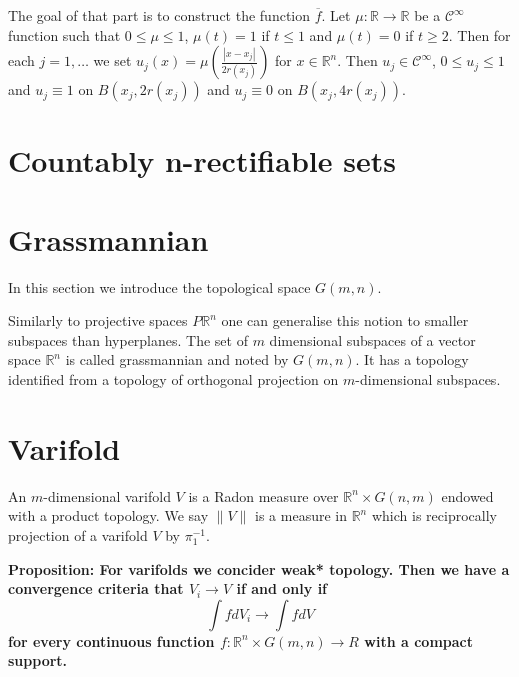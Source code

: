 \documentclass{article}
\begin{document}
\vspace{1ex}
The goal of that part is to construct the function $\overline f$. Let $\mu:
\mathbb{R}\rightarrow\mathbb{R}$ be a $\mathcal{C}^\infty$ function such that
$0\leq\mu\leq1$, $\mu(t) = 1$ if $t\leq 1$ and $\mu(t)=0$ if $t\geq 2$. Then
for each $j=1,\ldots$ we set $u_j(x)=\mu\left(\frac{|x-x_j|}{2r(x_j)}\right)$
for $x\in\mathbb{R}^n$. Then $u_j\in\mathcal{C}^\infty$, $0\leq u_j\leq1$ and
$u_j\equiv 1$ on $B(x_j, 2r(x_j))$ and $u_j\equiv 0$ on $B(x_j, 4r(x_j))$. 

\section{Countably n-rectifiable sets}


\section{Grassmannian}

In this section we introduce the topological space $G(m,n)$.
\vspace{1ex}

Similarly to projective spaces $P\mathbb{R}^n$ one can generalise this notion to
smaller subspaces than hyperplanes. The set of $m$ dimensional subspaces of a
vector space $\mathbb{R}^n$ is called grassmannian and noted by $G(m,n)$. It
has a topology identified from a topology of orthogonal projection on
$m$-dimensional subspaces.

\section{Varifold}

An $m$-dimensional varifold $V$ is a Radon measure over $\mathbb{R}^n\times
G(n,m)$ endowed with a product topology. We say $\|V\|$ is a measure in
$\mathbb{R}^n$ which is reciprocally projection of a varifold $V$ by $\pi_1^{-1}$.

\textbf{Proposition: For varifolds we concider weak* topology. Then we have a
convergence criteria that $V_i\rightarrow V$ if and only if
\[\int fdV_i\rightarrow\int fdV\]
for every continuous function $f:\mathbb{R}^n\times G(m,n)\rightarrow R$ with a
compact support.}
\vspace{1ex}
\end{document}
